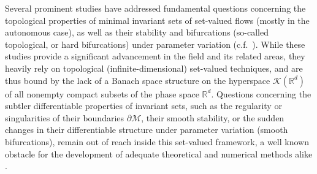 \documentclass[reqno]{amsart}
\theoremstyle{definition}
\numberwithin{equation}{section}
\newcommand{\M}{\mathscr{M}}
\begin{document}




Several prominent studies have addressed fundamental questions concerning the topological properties of minimal invariant sets of set-valued flows (mostly in the autonomous case), as well as their stability and bifurcations (so-called topological, or hard bifurcations) under parameter variation (c.f.~\cite{gayer2004control1,gayer2005controllability,homburgyoung2010bifrdssurfaces,homburgyounggheraei2013bifrds,lambrasmussen2015topbif,younghomburg2006hard}). While these studies provide a significant advancement in the field and its related areas, they heavily rely on topological (infinite-dimensional) set-valued techniques, and are thus bound by the lack of a Banach space structure on the hyperspace $\mathcal{K}(\mathbb{R}^d)$ of all nonempty compact subsets of the phase space $\mathbb{R}^d$. Questions concerning the subtler differentiable properties of invariant sets, such as the regularity or singularities of their boundaries $\partial \M$, their smooth stability, or the sudden changes in their differentiable structure under parameter variation (smooth bifurcations), remain out of reach inside this set-valued framework, a well known obstacle for the development of adequate theoretical and numerical methods alike \cite{colonius2012dynamics}.
\end{document}
